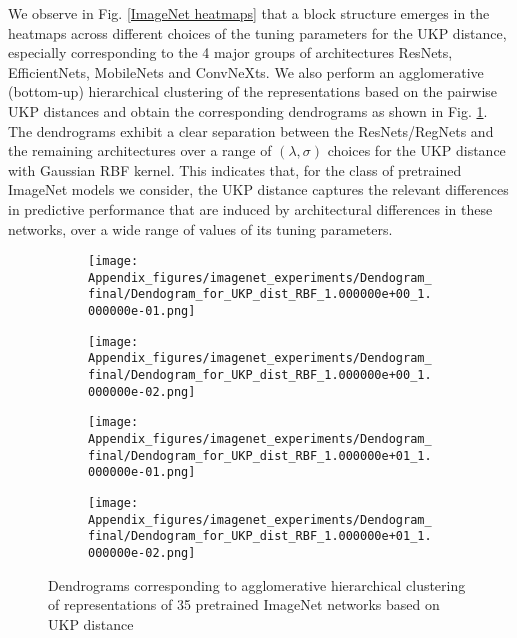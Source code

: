 \documentclass{article} %
\newcommand{\metricstname}{UKP }
\theoremstyle{plain}
\begin{document}
We observe in Fig. \ref{ImageNet heatmaps} that a block structure emerges in the heatmaps across different choices of the tuning parameters for the \metricstname distance, especially corresponding to the 4 major groups of architectures ResNets, EfficientNets, MobileNets and ConvNeXts. We also perform an agglomerative (bottom-up) hierarchical clustering of the representations based on the pairwise \metricstname distances and obtain the corresponding dendrograms as shown in Fig. \ref{ImageNet dendrograms}. The dendrograms exhibit a clear separation between the ResNets/RegNets and the remaining architectures over a range of $(\lambda,\sigma)$ choices for the \metricstname distance with Gaussian RBF kernel. This indicates that, for the class of pretrained ImageNet models we consider, the \metricstname distance captures the relevant differences in predictive performance that are induced by architectural differences in these networks, over a wide range of values of its tuning parameters.

\begin{figure}[!h]
    \centering
    \begin{subfigure}[b]{0.45\textwidth}
        \texttt{[image: Appendix\_figures/imagenet\_experiments/Dendogram\_final/Dendogram\_for\_UKP\_dist\_RBF\_1.000000e+00\_1.000000e-01.png]}
    \end{subfigure}
    \hfill
    \begin{subfigure}[b]{0.45\textwidth}
        \texttt{[image: Appendix\_figures/imagenet\_experiments/Dendogram\_final/Dendogram\_for\_UKP\_dist\_RBF\_1.000000e+00\_1.000000e-02.png]}
    \end{subfigure}
    
    \vspace{0.5cm}  %
    
    \begin{subfigure}[b]{0.45\textwidth}
        \texttt{[image: Appendix\_figures/imagenet\_experiments/Dendogram\_final/Dendogram\_for\_UKP\_dist\_RBF\_1.000000e+01\_1.000000e-01.png]}
    \end{subfigure}
    \hfill
    \begin{subfigure}[b]{0.45\textwidth}
        \texttt{[image: Appendix\_figures/imagenet\_experiments/Dendogram\_final/Dendogram\_for\_UKP\_dist\_RBF\_1.000000e+01\_1.000000e-02.png]}
    \end{subfigure}
    
    \caption{Dendrograms corresponding to agglomerative hierarchical clustering of representations of 35 pretrained ImageNet networks based on \metricstname distance}
    \label{ImageNet dendrograms}
\end{figure}
\end{document}
